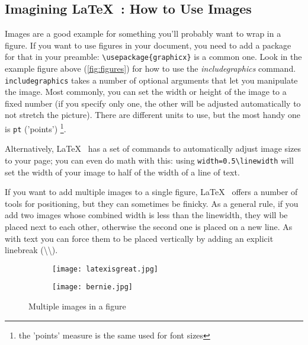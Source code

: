 \subsection{Imagining \LaTeX~: How to Use Images}

Images are a good example for something you'll probably want to wrap in a figure. If you want to use figures in your document, you need to add a package for that in your preamble: \texttt{\textbackslash usepackage\{graphicx\}} is a common one. Look in the example figure above (\ref{fig:figures}) for how to use the \textit{includegraphics} command.\\

\texttt{includegraphics} takes a number of optional arguments that let you manipulate the image. Most commonly, you can set the width or height of the image to a fixed number (if you specify only one, the other will be adjusted automatically to not stretch the picture). There are different units to use, but the most handy one is \texttt{pt} ('points') \footnote{the 'points' measure is the same used for font sizes}. 

Alternatively, \LaTeX~ has a set of commands to automatically adjust image sizes to your page; you can even do math with this: using \texttt{width=0.5\textbackslash linewidth} will set the width of your image to half of the width of a line of text.

If you want to add multiple images to a single figure, \LaTeX~ offers a number of tools for positioning, but they can sometimes be finicky. As a general rule, if you add two images whose combined width is less than the linewidth, they will be placed next to each other, otherwise the second one is placed on a new line. As with text you can force them to be placed vertically by adding an explicit linebreak (\textbackslash\textbackslash).\\

\begin{figure}[h!]
    \centering
    \begin{subfigure}{0.49\textwidth}
        \texttt{[image: latexisgreat.jpg]}
    \end{subfigure}
    \begin{subfigure}{0.49\textwidth}
        \texttt{[image: bernie.jpg]}
    \end{subfigure}
    \caption{Multiple images in a figure}
    \label{fig:texmeme}
\end{figure}

